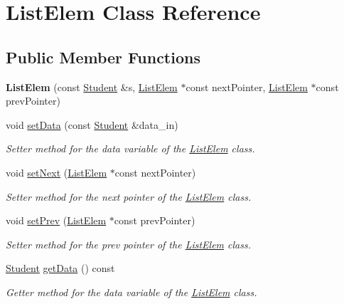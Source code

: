 \hypertarget{class_list_elem}{}\section{List\+Elem Class Reference}
\label{class_list_elem}
\subsection*{Public Member Functions}
\begin{DoxyCompactItemize}
\item 
\mbox{\label{class_list_elem_a77c58e8b0b890302f0a152f27f061477}} 
{\bfseries List\+Elem} (const \hyperlink{class_student}{Student} \&s, \hyperlink{class_list_elem}{List\+Elem} $\ast$const next\+Pointer, \hyperlink{class_list_elem}{List\+Elem} $\ast$const prev\+Pointer)
\item 
void \hyperlink{class_list_elem_a2eece4a9fa40234ee6529c0b50480694}{set\+Data} (const \hyperlink{class_student}{Student} \&data\+\_\+in)
\begin{DoxyCompactList}\small\item\em Setter method for the \textquotesingle{}data\textquotesingle{} variable of the \hyperlink{class_list_elem}{List\+Elem} class. \end{DoxyCompactList}\item 
void \hyperlink{class_list_elem_abe9b94948ec904d86a8d1b2218b05396}{set\+Next} (\hyperlink{class_list_elem}{List\+Elem} $\ast$const next\+Pointer)
\begin{DoxyCompactList}\small\item\em Setter method for the \textquotesingle{}next\textquotesingle{} pointer of the \hyperlink{class_list_elem}{List\+Elem} class. \end{DoxyCompactList}\item 
void \hyperlink{class_list_elem_ada49e1aa9796260cd47a7315650a39e6}{set\+Prev} (\hyperlink{class_list_elem}{List\+Elem} $\ast$const prev\+Pointer)
\begin{DoxyCompactList}\small\item\em Setter method for the \textquotesingle{}prev\textquotesingle{} pointer of the \hyperlink{class_list_elem}{List\+Elem} class. \end{DoxyCompactList}\item 
\hyperlink{class_student}{Student} \hyperlink{class_list_elem_af80ce8c80d9e4dfa450d9272c965e110}{get\+Data} () const
\begin{DoxyCompactList}\small\item\em Getter method for the \textquotesingle{}data\textquotesingle{} variable of the \hyperlink{class_list_elem}{List\+Elem} class. \end{DoxyCompactList}\item 

\end{DoxyCompactItemize}

